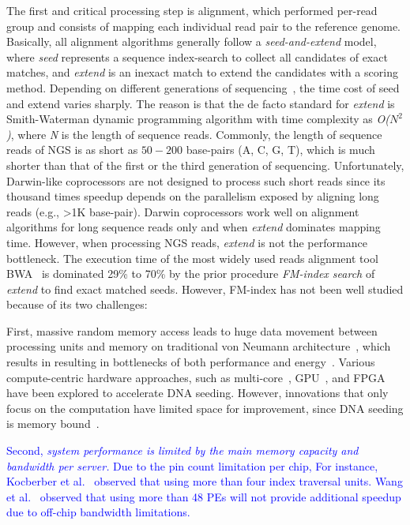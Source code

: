 \documentclass[9pt,conference]{IEEEtran}
\begin{document}
The first and critical processing step is alignment, which performed per-read group and consists of mapping each individual read pair to the reference genome. Basically, all alignment algorithms generally follow a \textit{seed-and-extend} model, where \textit{seed} represents a sequence index-search to collect all candidates of exact matches, and \textit{extend} is an inexact match to extend the candidates with a scoring method. 
Depending on different generations of sequencing~\cite{}, the time cost of seed and extend varies sharply. 
The reason is that the de facto standard for \textit{extend} is Smith-Waterman dynamic programming algorithm with time complexity as \textit{\textit{O}($N^2$)}, where \textit{N} is the length of sequence reads. 
Commonly, the length of sequence reads of NGS is as short as $50 - 200$ base-pairs (A, C, G, T), which is much shorter than that of the first or the third generation of sequencing. 
Unfortunately, Darwin-like coprocessors are not designed to process such short reads since its thousand times speedup depends on the parallelism exposed by aligning long reads (e.g., >1K base-pair). Darwin coprocessors work well on alignment algorithms for long sequence reads only and when \textit{extend} dominates mapping time.
However, when processing NGS reads, \textit{extend} is not the performance bottleneck. 
The execution time of the most widely used reads alignment tool BWA~\cite{li2013aligning} is dominated 29\% to 70\% by the prior procedure \textit{FM-index search} of \textit{extend} to find exact matched seeds. However, FM-index has not been well studied because of its two challenges: 

First, massive random memory access leads to huge data movement between processing units and memory on traditional von Neumann architecture~\cite{}, which results in resulting in bottlenecks of both performance and energy~\cite{}. Various compute-centric hardware approaches, such as multi-core~\cite{}, GPU~\cite{}, and FPGA~\cite{} have been explored to accelerate DNA seeding. However, innovations that only focus on the computation have limited space for improvement, since DNA seeding is memory bound~\cite{}. 

\textcolor{blue}{Second, \textit{system performance is limited by the main memory capacity and bandwidth per server.} Due to the pin count limitation per chip, For instance, Kocberber et al.~\cite{Kocberber:2013bb} observed that using more than four index traversal units. Wang et al.~\cite{yuanrong} observed that using more than 48 PEs will not provide additional speedup due to off-chip bandwidth limitations.}
\end{document}

